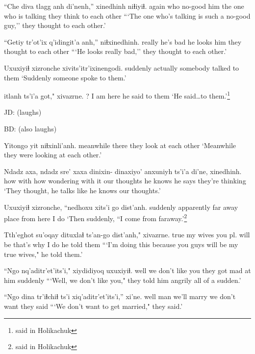 \documentclass[12pt]{article}
\begin{document}
\gll ``Che   diva tlagg   anh di'nenh,'' xinedhinh  niɬiyiɬ.
again who  {no-good} him {the one who is talking}  {they think} {to each other}
\glt ```The one who's talking is such a no-good guy,'' they thought to each other.'
\glend

\gll ``Getiy  tr'ot'ix q'idingit'a anh,'' niɬxinedhinh.
really {he's bad} {he looks}    him {they thought to each other}
\glt ```He looks really bad,'' they thought to each other.'
\glend

\gll Uxuxiyiɬ xizronche xivits'itr'ixinengodi.
suddenly    actually       {somebody talked to them}
\glt `Suddenly someone spoke to them.'
\glend

 itlanh ts'i'a got," xivazrne.
?                        {I am}  {}      here  {he said to them}
\glt `He said\ldots to them.'\footnote{said in Holikachuk}
\glend 

JD: (laughs)

BD: (also laughs)

\gll Yitongo   yit   niɬxinli'anh. 
meanwhile there {they look at each other}
\glt `Meanwhile they were looking at each other.'
\glend

\gll Ndadz axa, ndadz sre'      xaxa dinixin- dinaxiyo'    anxuniyh ts'i'a di'ne,     xinedhinh.
how        with  how   wondering  {with it}    {}   {our thoughts} {he knows}  {} {he says}  {they're thinking}
\glt `They thought, he talks like he knows our thoughts.'
\glend

\gll Uxuxiyiɬ xizronche, ``nedhoxu        xits'i go   dist'anh. 
suddenly  apparently       {far away place} from   here {I do}
\glt `Then suddenly, ``I come from faraway.'\footnote{said in Holikachuk} 
\glend

\gll Tth'eghot su'oqay  dituxlaɬ        ts'an-go   dist'anh," xivazrne.
true {my wives} {you pl. will be} {that's why} {I do}     {he told them  }
\glt ```I'm doing this because you guys will be my true wives," he told them.'
\glend

\gll ``Ngo  nq'aditr'et'its'i," xiydidiyoq          uxuxiyiɬ.
 well {we don't like you}  { they got mad at him} suddenly
\glt ```Well, we don't like you," they told him angrily all of a sudden.'
\glend

\gll ``Ngo  dina tr'iɬchiɬ   ts'i xiq'aditr'et'its'i,'' xi'ne.
well man  {we'll marry}  {}   { we don't want }     {they said}
\glt ```We don't want to get married," they said.'
\glend
\end{document}
